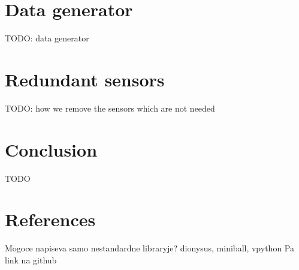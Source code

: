 \documentclass[a4paper, 12pt]{article}
\begin{document}
\section{Data generator}
TODO: data generator

\section{Redundant sensors}
TODO: how we remove the sensors which are not needed

\section{Conclusion}
TODO

\section{References}
Mogoce napiseva samo nestandardne libraryje? dionysus, miniball, vpython Pa link na github
\end{document}
